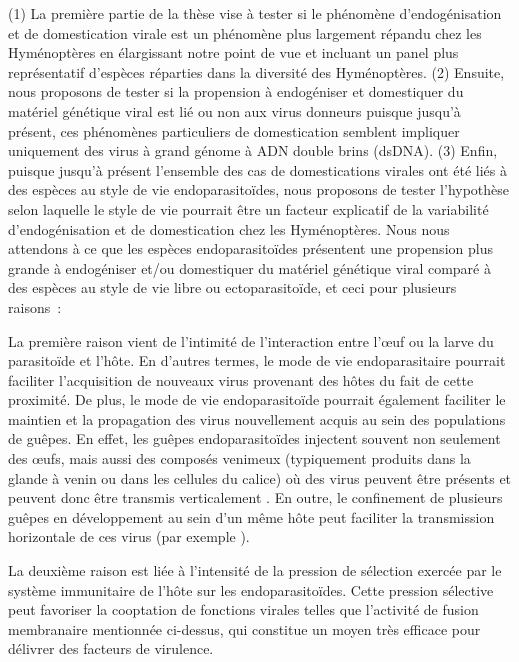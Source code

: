 (1) La première partie de la thèse vise à tester si le phénomène d'endogénisation et de domestication virale est un phénomène plus largement répandu chez les Hyménoptères en élargissant notre point de vue et incluant un panel plus représentatif d'espèces réparties dans la diversité des Hyménoptères. (2) Ensuite, nous proposons de tester si la propension à endogéniser et domestiquer du matériel génétique viral est lié ou non aux virus donneurs puisque jusqu'à présent, ces phénomènes particuliers de domestication semblent impliquer uniquement des virus à grand génome à ADN double brins (dsDNA). (3) Enfin, puisque jusqu'à présent l'ensemble des cas de domestications virales ont été liés à des espèces au style de vie endoparasitoïdes, nous proposons de tester l'hypothèse selon laquelle le style de vie pourrait être un facteur explicatif de la variabilité d'endogénisation et de domestication chez les Hyménoptères. 
Nous nous attendons à ce que les espèces endoparasitoïdes présentent une propension plus grande à endogéniser et/ou domestiquer du matériel génétique viral comparé à des espèces au style de vie libre ou ectoparasitoïde, et ceci pour plusieurs raisons : 

La première raison vient de l'intimité de l'interaction entre l'œuf ou la larve du parasitoïde et l'hôte. En d'autres termes, le mode de vie endoparasitaire pourrait faciliter l'acquisition de nouveaux virus provenant des hôtes du fait de cette proximité. De plus, le mode de vie endoparasitoïde pourrait également faciliter le maintien et la propagation des virus nouvellement acquis au sein des populations de guêpes. En effet, les guêpes endoparasitoïdes injectent souvent non seulement des œufs, mais aussi des composés venimeux (typiquement produits dans la glande à venin ou dans les cellules du calice) où des virus peuvent être présents et peuvent donc être transmis verticalement \citep{martinez_additional_2016, coffman_viral_2022, stasiak_characteristics_2005}.  En outre, le confinement de plusieurs guêpes en développement au sein d'un même hôte peut faciliter la transmission horizontale de ces virus (par exemple \cite{varaldi_infectious_2003}).

La deuxième raison est  liée à l'intensité de la pression de sélection exercée par le système immunitaire de l'hôte sur les endoparasitoïdes. Cette pression sélective peut favoriser la cooptation de fonctions virales telles que l'activité de fusion membranaire mentionnée ci-dessus, qui constitue un moyen très efficace pour délivrer des facteurs de virulence. 

